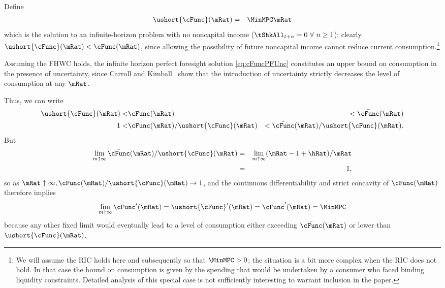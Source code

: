 \documentclass[titlepage]{\econtex}\providecommand{\texname}{BufferStockTheory}
\begin{document}
{\label{subsec:LimitsAsmtToInfty}

Define
\begin{eqnarray}
   \ushort{\cFunc}(\mRat) & = & \MinMPC \mRat \nonumber
\end{eqnarray}
which is the solution to an infinite-horizon problem with no noncapital
income
($\tShkAll_{t+n} = 0~\forall~n\geq1$); 
  clearly $\ushort{\cFunc}(\mRat)
< \cFunc(\mRat)$, since allowing the possibility of future noncapital
income cannot reduce current consumption.\footnote{We will assume the
  RIC holds here and subsequently so that $\MinMPC > 0$; the situation
  is a bit more complex when the RIC does not hold.   In that case the bound on consumption is given by the spending
  that would be undertaken by a consumer who faced binding liquidity
  constraints.  Detailed analysis of this special case is not
  sufficiently interesting to warrant inclusion in the paper.}

Assuming the FHWC holds, the infinite horizon perfect
foresight solution \eqref{eq:cFuncPFUnc} constitutes an upper
bound on consumption in the presence of uncertainty, since Carroll and
Kimball~\citeyearpar{ckConcavity} show that the introduction of
uncertainty strictly decreases the level of consumption at any $\mRat$.

Thus, we can write
\begin{eqnarray}  \label{eq:lowerltupper}
\ushort{\cFunc}(\mRat) < & \cFunc(\mRat) & < \bar{\cFunc}(\mRat) \nonumber \\
1 < & \cFunc(\mRat)/\ushort{\cFunc}(\mRat) & < \bar{\cFunc}(\mRat)/\ushort{\cFunc}(\mRat). \nonumber
\end{eqnarray}
But
\begin{eqnarray}  \label{eq:limitlowerupper}
\lim_{m \uparrow \infty} \bar{\cFunc}(\mRat)/\ushort{\cFunc}(\mRat) & = &
\lim_{m \uparrow \infty} (\mRat -1+ \hRat)/\mRat \nonumber \\
& = & 1, \nonumber
\end{eqnarray}
so as $\mRat \uparrow \infty, \cFunc(\mRat)/\ushort{\cFunc}(\mRat)
\rightarrow 1$, and the continuous differentiability and strict
concavity of $\cFunc(\mRat)$ therefore implies
\begin{equation}  \label{eq:limxtoinftycp}
\lim_{m \uparrow \infty} \cFunc^{\prime}(\mRat) =
\ushort{\cFunc}^{\prime}(\mRat) = \bar{\cFunc}^{\prime}(\mRat) = \MinMPC \notag
\end{equation}
because any other fixed limit would eventually lead to a level of
consumption either exceeding $\bar{\cFunc}(\mRat)$ or lower than
$\ushort{\cFunc}(\mRat)$.

}
\end{document}
